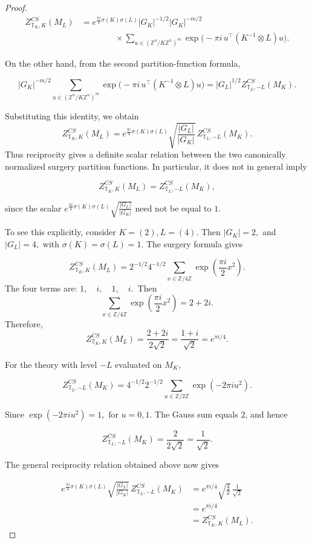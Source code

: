 \documentclass[12pt]{amsart}
\numberwithin{equation}{section}
\theoremstyle{definition}
\begin{document}
\begin{proof}
$$
\begin{aligned}
Z^{CS}_{\mathbb T_K,K}(M_L)
&=
e^{\frac{\pi i}{4}\sigma(K)\sigma(L)}
|G_K|^{-1/2}|G_K|^{-m/2}
\\
&\qquad\qquad\times
\sum_{u\in (\mathbb Z^n/K\mathbb Z^n)^m}
\exp\!\bigl(
-\pi i\,u^\top(K^{-1}\otimes L)u
\bigr).
\end{aligned}
$$

On the other hand, from the second partition-function formula,

$$
|G_K|^{-m/2}
\sum_{u\in (\mathbb Z^n/K\mathbb Z^n)^m}
\exp\!\bigl(
-\pi i\,u^\top(K^{-1}\otimes L)u
\bigr)
=
|G_L|^{1/2}
Z^{CS}_{\mathbb T_L,-L}(M_K).
$$

Substituting this identity, we obtain 
$$
Z^{CS}_{\mathbb T_K,K}(M_L)
=
e^{\frac{\pi i}{4}\sigma(K)\sigma(L)}
\sqrt{\frac{|G_L|}{|G_K|}}\,
Z^{CS}_{\mathbb T_L,-L}(M_K).
$$
Thus reciprocity gives a definite scalar relation between the two canonically normalized surgery partition functions. In particular, it does not in general imply

$$
Z^{CS}_{\mathbb T_K,K}(M_L)
=
Z^{CS}_{\mathbb T_L,-L}(M_K),
$$

since the scalar  $e^{\frac{\pi i}{4}\sigma(K)\sigma(L)}
\sqrt{\frac{|G_L|}{|G_K|}}
$ need not be equal to $1$. 

To see this explicitly, consider $K=(2), L=(4).$ Then $
|G_K|=2,$ and $|G_L|=4,$ with $\sigma(K)=\sigma(L)=1.
$ The surgery formula gives

$$
Z^{CS}_{\mathbb T_K,K}(M_L)
=
2^{-1/2}4^{-1/2}
\sum_{x\in\mathbb Z/4\mathbb Z}
\exp\!\left(\frac{\pi i}{2}x^2\right).
$$
The four terms are: $1,\quad i,\quad 1,\quad i.\,$ Then
$$
\sum_{x\in\mathbb Z/4\mathbb Z}
\exp\!\left(\frac{\pi i}{2}x^2\right)
=
2+2i.
$$
Therefore,
$$
Z^{CS}_{\mathbb T_K,K}(M_L)
=
\frac{2+2i}{2\sqrt2}
=
\frac{1+i}{\sqrt2}
=
e^{\pi i/4}.
$$

For the theory with level $-L$ evaluated on $M_K$,

$$
Z^{CS}_{\mathbb T_L,-L}(M_K)
=
4^{-1/2}2^{-1/2}
\sum_{u\in\mathbb Z/2\mathbb Z}
\exp(-2\pi i u^2).
$$

Since $
\exp(-2\pi i u^2)=1,\,\,
\text{for }u=0,1.$ The Gauss sum equals $2$, and hence

$$
Z^{CS}_{\mathbb T_L,-L}(M_K)
=
\frac{2}{2\sqrt2}
=
\frac1{\sqrt2}.
$$

The general reciprocity relation obtained above now gives

$$
\begin{aligned}
e^{\frac{\pi i}{4}\sigma(K)\sigma(L)}
\sqrt{\frac{|G_L|}{|G_K|}}\,
Z^{CS}_{\mathbb T_L,-L}(M_K)
&=
e^{\pi i/4}
\sqrt{\frac42}\,
\frac1{\sqrt2}
\\
&=
e^{\pi i/4}
\\
&=
Z^{CS}_{\mathbb T_K,K}(M_L).
\end{aligned}
$$


\end{proof}
\end{document}
